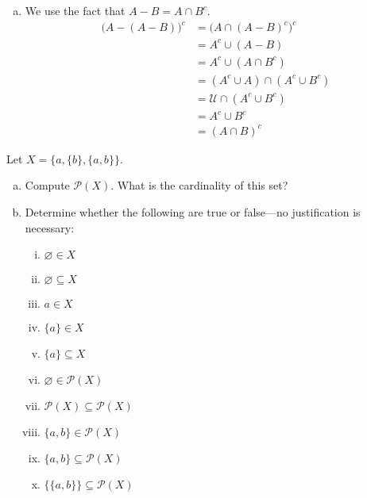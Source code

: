 \documentclass[11pt,letterpaper]{article}
\begin{document}
\begin{enumerate}[(a)]
\item We use the fact that $A - B= A \cap B^c$.
	\[
	\begin{aligned}
	\big( A - (A - B) \big)^c&= \big( A \cap (A - B)^c \big)^c \\
	&= A^c \cup (A - B) \\
	&= A^c \cup (A \cap B^c) \\
	&= (A^c \cup A) \cap (A^c \cup B^c) \\
	&= \mathcal{U} \cap (A^c \cup B^c) \\
	&= A^c \cup B^c \\
	&= (A \cap B)^c
	\end{aligned}
	\] 
\end{enumerate}



\newpage



 Let $X= \{ a, \{ b \}, \{ a, b \} \}$. 
	\begin{enumerate}[(a)]
	\item Compute $\mathcal{P}(X)$. What is the cardinality of this set?
	\item Determine whether the following are true or false---no justification is necessary:
		\begin{multicols}{2}
		\begin{enumerate}[(i)]
		\item $\varnothing \in X$
		\item $\varnothing \subseteq X$
		\item $a \in X$
		\item $\{ a \} \in X$
		\item $\{ a \} \subseteq X$
		\item $\varnothing \in \mathcal{P}(X)$
		\item $\mathcal{P}(X) \subseteq \mathcal{P}(X)$
		\item $\{ a, b \} \in \mathcal{P}(X)$
		\item $\{ a, b \} \subseteq \mathcal{P}(X)$
		\item $\{ \{ a, b \} \} \subseteq \mathcal{P}(X)$
		\end{enumerate}
		\end{multicols}
	\end{enumerate}
\end{document}
